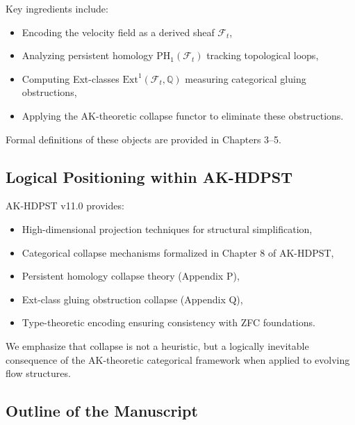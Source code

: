\documentclass[11pt]{article}
\begin{document}
Key ingredients include:
\begin{itemize}
  \item Encoding the velocity field as a derived sheaf \( \mathcal{F}_t \),
  \item Analyzing persistent homology \( \mathrm{PH}_1(\mathcal{F}_t) \) tracking topological loops,
  \item Computing Ext-classes \( \mathrm{Ext}^1(\mathcal{F}_t, \mathbb{Q}) \) measuring categorical gluing obstructions,
  \item Applying the AK-theoretic collapse functor to eliminate these obstructions.
\end{itemize}

Formal definitions of these objects are provided in Chapters 3–5.

\subsection{Logical Positioning within AK-HDPST}

AK-HDPST v11.0 provides:
\begin{itemize}
  \item High-dimensional projection techniques for structural simplification,
  \item Categorical collapse mechanisms formalized in Chapter 8 of AK-HDPST,
  \item Persistent homology collapse theory (Appendix P),
  \item Ext-class gluing obstruction collapse (Appendix Q),
  \item Type-theoretic encoding ensuring consistency with ZFC foundations.
\end{itemize}

We emphasize that collapse is not a heuristic, but a logically inevitable consequence of the AK-theoretic categorical framework when applied to evolving flow structures.

\subsection{Outline of the Manuscript}
\end{document}
